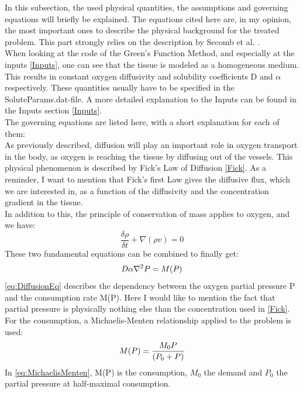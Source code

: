 In this subsection, the used physical quantities, the assumptions and governing equations will briefly be explained. The equations cited here are, in my opinion, the most important ones to describe the physical background for the treated problem. This part strongly relies on the description by Secomb et al. \cite{Secomb2004}.
\\When looking at the code of the Green's Function Method, and especially at the inputs \ref{Inputs}, one can see that the tissue is modeled as a homogeneous medium. This results in constant oxygen diffusivity and solubility coefficients D and $\alpha$ respectively. These quantities usually have to be specified in the SoluteParams.dat-file. A more detailed explanation to the Inputs can be found in the Inputs section \ref{Inputs}.
\\The governing equations are listed here, with a short explanation for each of them:
\\As previously described, diffusion will play an important role in oxygen transport in the body, as oxygen is reaching the tissue by diffusing out of the vessels. This physical phenomenon is described by Fick's Law of Diffusion \ref{Fick}.
%
As a reminder, I want to mention that Fick's first Law gives the diffusive flux, which we are interested in, as a function of the diffusivity and the concentration gradient in the tissue.
\\In addition to this, the principle of conservation of mass applies to oxygen, and we have:
\begin{equation}
\frac{\delta \rho} {\delta t} + \nabla (\rho v) = 0
\end{equation}
%
These two fundamental equations can be combined to finally get:
\begin{equation}
\\D\alpha\nabla^2P = M(P)
\label{eq:DiffusionEq}
\end{equation}
%
\ref{eq:DiffusionEq} describes the dependency between the oxygen partial pressure P and the consumption rate M(P). Here I would like to mention the fact that partial pressure is physically nothing else than the concentration used in \ref{Fick}.
For the consumption, a Michaelis-Menten relationship applied to the problem is used:
\begin{equation}
\\M(P) = \frac{M_0P}{(P_0 + P)}
\label{eq:MichaelisMenten}
\end{equation}
%
In \ref{eq:MichaelisMenten}, M(P) is the consumption, $M_0$ the demand and $P_0$ the partial pressure at half-maximal consumption.
